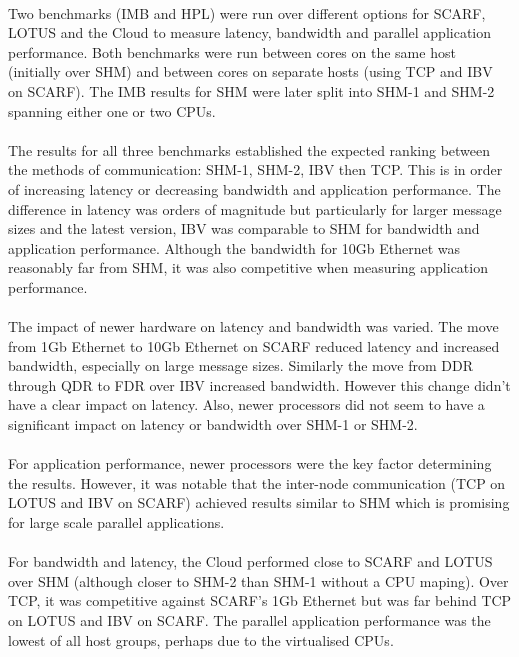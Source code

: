 \documentclass{article}
\begin{document}
    \paragraph{}
    Two benchmarks (IMB and HPL) were run over different options for SCARF, LOTUS and the Cloud to measure latency, bandwidth and parallel application performance. Both benchmarks were run between cores on the same host (initially over SHM) and between cores on separate hosts (using TCP and IBV on SCARF). The IMB results for SHM were later split into SHM-1 and SHM-2 spanning either one or two CPUs.

    \paragraph{}
    The results for all three benchmarks established the expected ranking between the methods of communication: SHM-1, SHM-2, IBV then TCP. This is in order of increasing latency or decreasing bandwidth and application performance. The difference in latency was orders of magnitude but particularly for larger message sizes and the latest version, IBV was comparable to SHM for bandwidth and application performance. Although the bandwidth for 10Gb Ethernet was reasonably far from SHM, it was also competitive when measuring application performance.

    \paragraph{}
    The impact of newer hardware on latency and bandwidth was varied. The move from 1Gb Ethernet to 10Gb Ethernet on SCARF reduced latency and increased bandwidth, especially on large message sizes. Similarly the move from DDR through QDR to FDR over IBV increased bandwidth. However this change didn't have a clear impact on latency. Also, newer processors did not seem to have a significant impact on latency or bandwidth over SHM-1 or SHM-2.

    \paragraph{}
    For application performance, newer processors were the key factor determining the results. However, it was notable that the inter-node communication (TCP on LOTUS and IBV on SCARF) achieved results similar to SHM which is promising for large scale parallel applications.

    \paragraph{}
    For bandwidth and latency, the Cloud performed close to SCARF and LOTUS over SHM (although closer to SHM-2 than SHM-1 without a CPU maping). Over TCP, it was competitive against SCARF's 1Gb Ethernet but was far behind TCP on LOTUS and IBV on SCARF. The parallel application performance was the lowest of all host groups, perhaps due to the virtualised CPUs.
\end{document}
